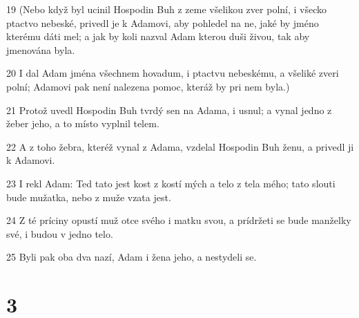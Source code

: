 \par 19 (Nebo když byl ucinil Hospodin Buh z zeme všelikou zver polní, i všecko ptactvo nebeské, privedl je k Adamovi, aby pohledel na ne, jaké by jméno kterému dáti mel; a jak by koli nazval Adam kterou duši živou, tak aby jmenována byla.
\par 20 I dal Adam jména všechnem hovadum, i ptactvu nebeskému, a všeliké zveri polní; Adamovi pak není nalezena pomoc, kteráž by pri nem byla.)
\par 21 Protož uvedl Hospodin Buh tvrdý sen na Adama, i usnul; a vynal jedno z žeber jeho, a to místo vyplnil telem.
\par 22 A z toho žebra, kteréž vynal z Adama, vzdelal Hospodin Buh ženu, a privedl ji k Adamovi.
\par 23 I rekl Adam: Ted tato jest kost z kostí mých a telo z tela mého; tato slouti bude mužatka, nebo z muže vzata jest.
\par 24 Z té príciny opustí muž otce svého i matku svou, a prídržeti se bude manželky své, i budou v jedno telo.
\par 25 Byli pak oba dva nazí, Adam i žena jeho, a nestydeli se.

\chapter{3}

